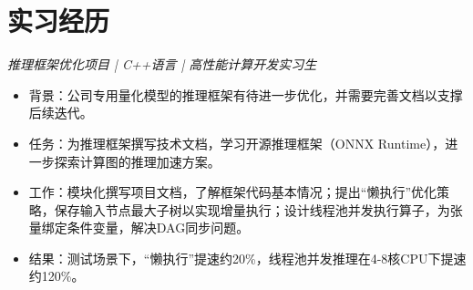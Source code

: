 \documentclass{resume}
\begin{document}
\section{实习经历}
\textit{推理框架优化项目 | C++语言 | 高性能计算开发实习生}
\begin{itemize}
  \item 背景：公司专用量化模型的推理框架有待进一步优化，并需要完善文档以支撑后续迭代。
  \item 任务：为推理框架撰写技术文档，学习开源推理框架（ONNX Runtime），进一步探索计算图的推理加速方案。
  \item 工作：模块化撰写项目文档，了解框架代码基本情况；提出“懒执行”优化策略，保存输入节点最大子树以实现增量执行；设计线程池并发执行算子，为张量绑定条件变量，解决DAG同步问题。
  \item 结果：测试场景下，“懒执行”提速约20\%，线程池并发推理在4-8核CPU下提速约120\%。
\end{itemize}
\end{document}
